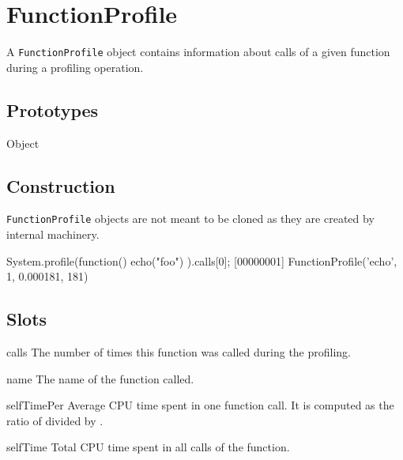 
\section{FunctionProfile}

A \lstinline|FunctionProfile| object contains information about calls of a
given function during a profiling operation.

\subsection{Prototypes}

\begin{refObjects}
\item[Object]
\end{refObjects}

\subsection{Construction}

\lstinline|FunctionProfile| objects are not meant to be cloned as they are
created by  internal machinery.

\begin{urbi}
System.profile(function() { echo("foo") }).calls[0];
[00000001] FunctionProfile('echo', 1, 0.000181, 181)
\end{urbi}

\subsection{Slots}

\begin{urbiscriptapi}

\item[calls]%
  The number of times this function was called during the profiling.

\item[name]%
  The name of the function called.

\item[selfTimePer]%
  Average CPU time spent in one function call. It is computed as the ratio
  of  divided by .

\item[selfTime]%
  Total CPU time spent in all calls of the function.

\end{urbiscriptapi}


